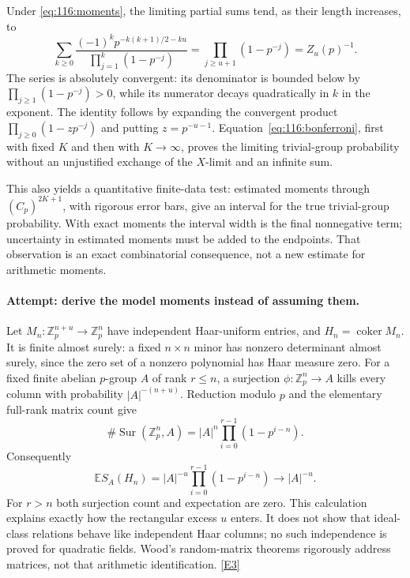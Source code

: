 \documentclass[11pt,a4paper]{article}
\newcommand{\Z}{\mathbb{Z}}
\newcommand{\E}{\mathbb{E}}
\newcommand{\eref}[2]{\hyperlink{extra:#1:#2}{[E#2]}}
\numberwithin{equation}{section}
\begin{document}
Under \eqref{eq:116:moments}, the limiting partial sums tend, as their
length increases, to
\begin{equation}\label{eq:116:euler}
 \sum_{k\geq0}
 \frac{(-1)^k p^{-k(k+1)/2-ku}}{\prod_{j=1}^k(1-p^{-j})}
 =\prod_{j\geq u+1}(1-p^{-j})=Z_u(p)^{-1}.
\end{equation}
The series is absolutely convergent: its denominator is bounded below by
$\prod_{j\geq1}(1-p^{-j})>0$, while its numerator decays quadratically in
$k$ in the exponent. The identity follows by expanding the convergent
product $\prod_{j\geq0}(1-zp^{-j})$ and putting $z=p^{-u-1}$.
Equation~\eqref{eq:116:bonferroni}, first with fixed $K$ and then with
$K\to\infty$, proves the limiting trivial-group probability without an
unjustified exchange of the $X$-limit and an infinite sum.

This also yields a quantitative finite-data test: estimated moments through
$(C_p)^{2K+1}$, with rigorous error bars, give an interval for the true
trivial-group probability. With exact moments the interval width is the final nonnegative term;
uncertainty in estimated moments must be added to the endpoints. That observation is an exact combinatorial consequence, not a
new estimate for arithmetic moments.

\paragraph{Attempt: derive the model moments instead of assuming them.}
Let $M_n:\Z_p^{n+u}\to\Z_p^n$ have independent Haar-uniform entries,
and $H_n=\operatorname{coker}M_n$. It is finite almost surely: a fixed
$n\times n$ minor has nonzero determinant almost surely, since the zero
set of a nonzero polynomial has Haar measure zero. For a fixed finite
abelian $p$-group $A$ of rank $r\leq n$, a surjection
$\phi:\Z_p^n\to A$ kills every column with probability
$|A|^{-(n+u)}$. Reduction modulo $p$ and the elementary full-rank matrix
count give
\[
 \#\operatorname{Sur}(\Z_p^n,A)
 =|A|^n\prod_{i=0}^{r-1}(1-p^{i-n}).
\]
Consequently
\begin{equation}\label{eq:116:Haar}
 \E S_A(H_n)=|A|^{-u}\prod_{i=0}^{r-1}(1-p^{i-n})
 \longrightarrow |A|^{-u}.
\end{equation}
For $r>n$ both surjection count and expectation are zero. This calculation
explains exactly how the rectangular excess $u$ enters. It does not show
that ideal-class relations behave like independent Haar columns; no
such independence is proved for quadratic fields. Wood's random-matrix
theorems rigorously address matrices, not that arithmetic identification.
\eref{116}{3}
\end{document}
